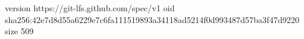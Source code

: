 version https://git-lfs.github.com/spec/v1
oid sha256:42e7d8d55a6229e7c6fa111519893a34118ad5214f0d993487d57ba3f47d9220
size 509
